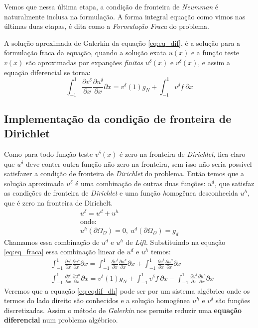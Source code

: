 Vemos que nessa última etapa, a condição de fronteira de \emph{Neumman} é naturalmente inclusa na formulação. A forma integral  equação como vimos nas últimas duas etapas, é dita como a \emph{Formulação Fraca} do problema.

A solução aproximada de Galerkin da equação \eqref{eq:eq_dif}, é a solução para a formulação fraca da equação, quando a solução exata $u(x)$ e a função teste $v(x)$ são aproximadas por expanções \emph{finitas} $u^\delta(x)$ e $v^\delta(x)$, e assim a  equação diferencial se torna:
\begin{equation}\label{eq:eqdif_neumann}
 \int^{1}_{-1} \frac{\partial v^\delta}{\partial x}  \frac{\partial u^\delta}{\partial x}  \partial x =  v^\delta(1)g_N + \int^{1}_{-1}  v^\delta f\ \partial x 
\end{equation}
\subsection{Implementação da condição de fronteira de Dirichlet}
 Como para todo função teste $v^\delta(x)$ é zero na fronteira de \emph{Dirichlet}, fica claro que $u^\delta$ deve conter outra função não zero na fronteira, sem isso não seria possível satisfazer a condição de fronteira de \emph{Dirichlet} do problema. Então temos que a solução aproximada $u^\delta$ é uma combinação de outras duas funções: $u^d$, que satisfaz as condições de fronteira de \emph{Dirichlet} e uma função \emph{h}omogênea desconhecida $u^h$, que é zero na fronteira de Dirichelt.
 \begin{align}
 u^\delta = u^d + u^h \\
 \text{onde:}\\
 u^h(\partial \Omega_D) = 0,\ u^d(\partial \Omega_D) = g_d
 \end{align}
 Chamamos essa combinação de $u^d$ e $u^h$ de \emph{Lift}. Substituindo na equação \ref{eq:eq_fraca} essa combinação linear de $u^d$ e $u^h$ temos:
 \begin{align}\label{eq:eqdif_dh}
 & \int^{1}_{-1} \frac{\partial v^\delta}{\partial x}  \frac{\partial u^\delta}{\partial x}  \partial x =  \int^{1}_{-1} \frac{\partial v^\delta}{\partial x}  \frac{\partial u^h}{\partial x}  \partial x  +  \int^{1}_{-1} \frac{\partial v^\delta}{\partial x}  \frac{\partial u^d}{\partial x}  \partial x \\
& \int^{1}_{-1} \frac{\partial v^\delta}{\partial x}  \frac{\partial u^h}{\partial x}  \partial x=  v^\delta(1)g_N + \int^{1}_{-1}  v^\delta f\ \partial x -    \int^{1}_{-1} \frac{\partial v^\delta}{\partial x}  \frac{\partial u^d}{\partial x}  \partial x 
 \end{align}
 Veremos que a equação \eqref{eq:eqdif_dh} pode ser por um sistema algébrico onde os termos do lado direito são conhecidos e a solução homogênea $u^h$ e $v^\delta$ são funções discretizadas. Assim o método de \emph{Galerkin} nos permite reduzir uma \textbf{equação diferencial} num problema algébrico.

